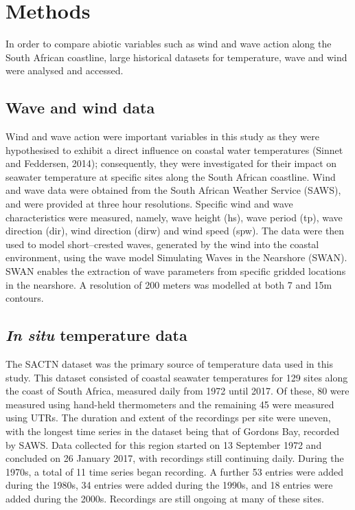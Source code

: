 \documentclass[10pt,a4paper,]{article}
\begin{document}
\hypertarget{methods}{%
\section{Methods}\label{methods}}

In order to compare abiotic variables such as wind and wave action along
the South African coastline, large historical datasets for temperature,
wave and wind were analysed and accessed.

\hypertarget{wave-and-wind-data}{%
\subsection{Wave and wind data}\label{wave-and-wind-data}}

Wind and wave action were important variables in this study as they were
hypothesised to exhibit a direct influence on coastal water temperatures
(Sinnet and Feddersen, 2014); consequently, they were investigated for
their impact on seawater temperature at specific sites along the South
African coastline. Wind and wave data were obtained from the South
African Weather Service (SAWS), and were provided at three hour
resolutions. Specific wind and wave characteristics were measured,
namely, wave height (hs), wave period (tp), wave direction (dir), wind
direction (dirw) and wind speed (spw). The data were then used to model
short--crested waves, generated by the wind into the coastal
environment, using the wave model Simulating Waves in the Nearshore
(SWAN). SWAN enables the extraction of wave parameters from specific
gridded locations in the nearshore. A resolution of 200 meters was
modelled at both 7 and 15m contours.

\hypertarget{in-situ-temperature-data}{%
\subsection{\texorpdfstring{\emph{In situ} temperature
data}{In situ temperature data}}\label{in-situ-temperature-data}}

The SACTN dataset was the primary source of temperature data used in
this study. This dataset consisted of coastal seawater temperatures for
129 sites along the coast of South Africa, measured daily from 1972
until 2017. Of these, 80 were measured using hand-held thermometers and
the remaining 45 were measured using UTRs. The duration and extent of
the recordings per site were uneven, with the longest time series in the
dataset being that of Gordons Bay, recorded by SAWS. Data collected for
this region started on 13 September 1972 and concluded on 26 January
2017, with recordings still continuing daily. During the 1970s, a total
of 11 time series began recording. A further 53 entries were added
during the 1980s, 34 entries were added during the 1990s, and 18 entries
were added during the 2000s. Recordings are still ongoing at many of
these sites.
\end{document}
